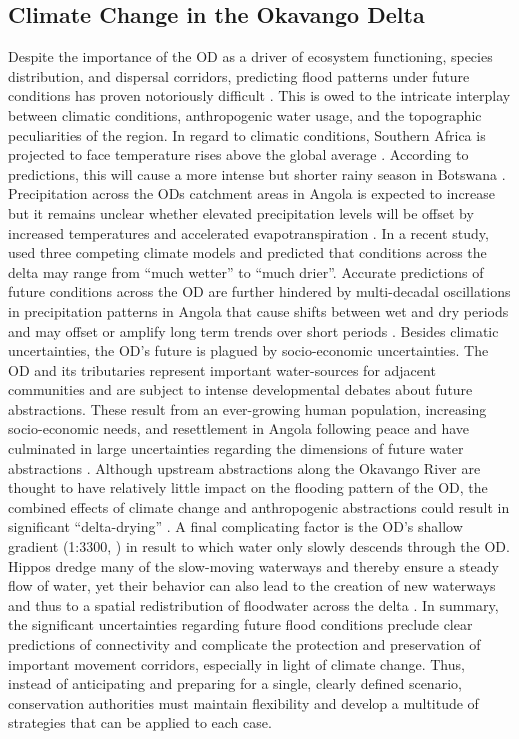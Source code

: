 \documentclass[abstract=on,10pt,a4paper,bibliography=totocnumbered]{article}
\begin{document}
\subsection{Climate Change in the Okavango Delta}
Despite the importance of the OD as a driver of ecosystem functioning, species
distribution, and dispersal corridors, predicting flood patterns under future
conditions has proven notoriously difficult \citep{Wolski.2008}. This is owed to
the intricate interplay between climatic conditions, anthropogenic water usage,
and the topographic peculiarities of the region. In regard to climatic
conditions, Southern Africa is projected to face temperature rises above the
global average \citep{Engelbrecht.2015}. According to predictions, this will
cause a more intense but shorter rainy season in Botswana \citep{Akinyemi.2019}.
Precipitation across the ODs catchment areas in Angola is expected to increase
but it remains unclear whether elevated precipitation levels will be offset by
increased temperatures and accelerated evapotranspiration \citep{Wolski.2008,
Moses.2018}. In a recent study, \cite{Wolski.2008} used three competing climate
models and predicted that conditions across the delta may range from ``much
wetter'' to ``much drier''. Accurate predictions of future conditions across the
OD are further hindered by multi-decadal oscillations in precipitation patterns
in Angola that cause shifts between wet and dry periods and may offset or
amplify long term trends over short periods \citep{Wolski.2008, Wolski.2012}.
Besides climatic uncertainties, the OD's future is plagued by socio-economic
uncertainties. The OD and its tributaries represent important water-sources for
adjacent communities and are subject to intense developmental debates about
future abstractions. These result from an ever-growing human population,
increasing socio-economic needs, and resettlement in Angola following peace
\citep{Kgathi.2006} and have culminated in large uncertainties regarding the
dimensions of future water abstractions \citep{Hughes.2011}. Although upstream
abstractions along the Okavango River are thought to have relatively little
impact on the flooding pattern of the OD, the combined effects of climate change
and anthropogenic abstractions could result in significant ``delta-drying''
\citep{Murray-Hudson.2006}. A final complicating factor is the OD's shallow
gradient (1:3300, \citealp{Gumbricht.2004}) in result to which water only slowly
descends through the OD. Hippos dredge many of the slow-moving waterways and
thereby ensure a steady flow of water, yet their behavior can also lead to the
creation of new waterways and thus to a spatial redistribution of floodwater
across the delta \citep{McCarthy.1998a}. In summary, the significant
uncertainties regarding future flood conditions preclude clear predictions of
connectivity and complicate the protection and preservation of important
movement corridors, especially in light of climate change. Thus, instead of
anticipating and preparing for a single, clearly defined scenario, conservation
authorities must maintain flexibility and develop a multitude of strategies that
can be applied to each case.
\end{document}
